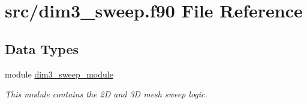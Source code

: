 \hypertarget{dim3__sweep_8f90}{\section{src/dim3\-\_\-sweep.f90 File Reference}
\label{dim3__sweep_8f90}
}
\subsection*{Data Types}
\begin{DoxyCompactItemize}
\item 
module \hyperlink{classdim3__sweep__module}{dim3\-\_\-sweep\-\_\-module}
\begin{DoxyCompactList}\small\item\em This module contains the 2\-D and 3\-D mesh sweep logic. \end{DoxyCompactList}\end{DoxyCompactItemize}
